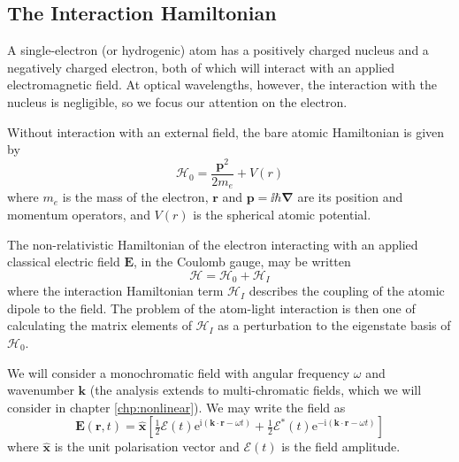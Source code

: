   \subsection{The Interaction Hamiltonian}

    A single-electron (or hydrogenic) atom has a positively charged nucleus and
    a negatively charged electron, both of which will interact with an applied
    electromagnetic field. At optical wavelengths, however, the interaction with
    the nucleus is negligible\cite{bransden2003physics}, so we focus our
    attention on the electron.

    Without interaction with an external field, the bare atomic Hamiltonian is
    given by
    \begin{equation}
      \mathcal{H}_0 = \frac{\mathbf{p}^2}{2 m_e} + V(r)
    \end{equation}
    where $m_e$ is the mass of the electron, $\mathbf{r}$ and $\mathbf{p} = \ii
    \hbar \mathbf{\nabla}$ are its position and momentum operators, and $V(r)$
    is the spherical atomic potential.

    The non-relativistic Hamiltonian of the electron interacting with an applied
    classical electric field $\mathbf{E}$, in the Coulomb gauge, may be written
    \begin{equation}
        \mathcal{H} = \mathcal{H}_0 + \mathcal{H}_I
    \end{equation}
    where the interaction Hamiltonian term $\mathcal{H}_I$ describes the
    coupling of the atomic dipole to the field.\cite{bransden2003physics}  The
    problem of the atom-light interaction is then one of calculating the matrix
    elements of $\mathcal{H}_I$ as a perturbation to the eigenstate basis of
    $\mathcal{H}_0$.

    We will consider a monochromatic field with angular frequency $\omega$ and
    wavenumber $\mathbf{k}$ (the analysis extends to multi-chromatic fields,
    which we will consider in chapter \ref{chp:nonlinear}). We may write the
    field as
    \begin{equation}
      \label{eqn:envelope_carrier}
      \mathbf{E}(\mathbf{r}, t) = \hat{\mathbf{x}} 
      \left[ \tfrac{1}{2} \mathcal{E}(t) 
      \mathrm{e}^{\mathrm{i}(\mathbf{k} \cdot \mathbf{r} - \omega t)} + 
      \tfrac{1}{2} \mathcal{E}^*(t) \mathrm{e}^{-\mathrm{i}(\mathbf{k} \cdot 
      \mathbf{r} - \omega t)} \right]
    \end{equation}
    where $\hat{\mathbf{x}}$ is the unit polarisation vector and 
    $\mathcal{E}(t)$ is the field amplitude.    

